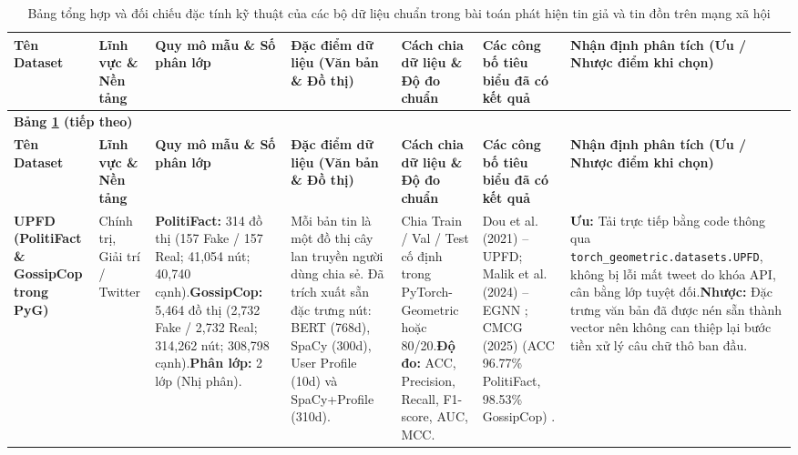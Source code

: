 \documentclass[11pt,a4paper]{extreport}
\begin{document}
\begin{landscape}
\footnotesize
\renewcommand{\arraystretch}{1.35}
\setlength{\tabcolsep}{4pt}
\begin{longtable}{@{}p{2.8cm}p{2.2cm}p{2.8cm}p{3.8cm}p{3.2cm}p{3.6cm}p{4.2cm}@{}}
\caption{Bảng tổng hợp và đối chiếu đặc tính kỹ thuật của các bộ dữ liệu chuẩn trong bài toán phát hiện tin giả và tin đồn trên mạng xã hội}
\label{tab:dataset-candidates}\\
\toprule
\textbf{Tên Dataset} & \textbf{Lĩnh vực \& Nền tảng} & \textbf{Quy mô mẫu \& Số phân lớp} & \textbf{Đặc điểm dữ liệu (Văn bản \& Đồ thị)} & \textbf{Cách chia dữ liệu \& Độ đo chuẩn} & \textbf{Các công bố tiêu biểu đã có kết quả} & \textbf{Nhận định phân tích (Ưu / Nhược điểm khi chọn)} \\
\toprule
\endfirsthead
\multicolumn{7}{l}{\textbf{Bảng \ref{tab:dataset-candidates} (tiếp theo)}}\\
\toprule
\textbf{Tên Dataset} & \textbf{Lĩnh vực \& Nền tảng} & \textbf{Quy mô mẫu \& Số phân lớp} & \textbf{Đặc điểm dữ liệu (Văn bản \& Đồ thị)} & \textbf{Cách chia dữ liệu \& Độ đo chuẩn} & \textbf{Các công bố tiêu biểu đã có kết quả} & \textbf{Nhận định phân tích (Ưu / Nhược điểm khi chọn)} \\
\toprule
\endhead
\toprule
\bottomrule \endlastfoot

\textbf{UPFD (PolitiFact \& GossipCop trong PyG)} \cite{noauthor_ensemble_2024, noauthor_co-attention_2025} & Chính trị, Giải trí / Twitter & \textbf{PolitiFact:} 314 đồ thị (157 Fake / 157 Real; 41,054 nút; 40,740 cạnh).\newline \textbf{GossipCop:} 5,464 đồ thị (2,732 Fake / 2,732 Real; 314,262 nút; 308,798 cạnh).\newline \textbf{Phân lớp:} 2 lớp (Nhị phân). & Mỗi bản tin là một đồ thị cây lan truyền người dùng chia sẻ. Đã trích xuất sẵn đặc trưng nút: BERT (768d), SpaCy (300d), User Profile (10d) và SpaCy+Profile (310d). & Chia Train / Val / Test cố định trong PyTorch-Geometric hoặc 80/20.\newline \textbf{Độ đo:} ACC, Precision, Recall, F1-score, AUC, MCC. & Dou et al. (2021) -- UPFD; Malik et al. (2024) -- EGNN \cite{noauthor_ensemble_2024}; CMCG (2025) (ACC 96.77\% PolitiFact, 98.53\% GossipCop) \cite{noauthor_co-attention_2025}. & \textbf{Ưu:} Tải trực tiếp bằng code thông qua \texttt{torch\_\allowbreak geometric.\allowbreak datasets.\allowbreak UPFD}, không bị lỗi mất tweet do khóa API, cân bằng lớp tuyệt đối.\newline \textbf{Nhược:} Đặc trưng văn bản đã được nén sẵn thành vector nên không can thiệp lại bước tiền xử lý câu chữ thô ban đầu. \\ 


\end{longtable}
\end{landscape}
\end{document}

